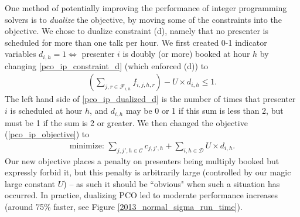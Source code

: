 \documentclass[]{article}
\theoremstyle{definition}
\theoremstyle{remark}
\numberwithin{equation}{section}
\begin{document}
One method of potentially improving the performance of integer programming solvers is to \emph{dualize} the objective, by moving some of the constraints into the objective. We chose to dualize constraint (d), namely that no presenter is scheduled for more than one talk per hour. We first created 0-1 indicator variables $d_{i,h} = 1 \iff $ presenter $i$ is doubly (or more) booked at hour $h$ by changing \ref{pco_ip_constraint_d} (which enforced (d)) to
\begin{gather}
	\left( \sum_{j,r \in \mathcal F_{i,h}} f_{i,j,h,r} \right) - U \times d_{i,h} \le 1. \label{pco_ip_dualized_d}
\end{gather}
The left hand side of \ref{pco_ip_dualized_d} is the number of times that presenter $i$ is scheduled at hour $h$, and $d_{i,h}$ may be 0 or 1 if this sum is less than 2, but must be 1 if the sum is 2 or greater. We then changed the objective (\ref{pco_ip_objective}) to 
\begin{gather}
	\text{minimize: } \sum_{j,j',h \in \mathcal C} c_{j,j',h} + \sum_{i,h \in \mathcal D} U \times d_{i,h}.
\end{gather}
Our new objective places a penalty on presenters being multiply booked but expressly forbid it, but this penalty is arbitrarily large (controlled by our magic large constant $U$) -- as such it should be ``obvious" when such a situation has occurred. In practice, dualizing PCO led to moderate performance increases (around 75\% faster, see Figure \ref{2013_normal_sigma_run_time}).
\end{document}
